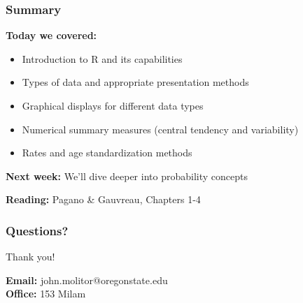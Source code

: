 \documentclass{beamer}
\begin{document}
\begin{frame}
\frametitle{Summary}
\textbf{Today we covered:}
\begin{itemize}
\item Introduction to R and its capabilities
\item Types of data and appropriate presentation methods
\item Graphical displays for different data types
\item Numerical summary measures (central tendency and variability)
\item Rates and age standardization methods
\end{itemize}

\vspace{0.5cm}
\textbf{Next week:} We'll dive deeper into probability concepts

\vspace{0.5cm}
\textbf{Reading:} Pagano \& Gauvreau, Chapters 1-4
\end{frame}

\begin{frame}
\frametitle{Questions?}
\begin{center}
\Large{Thank you!}

\vspace{1cm}

\textbf{Email:} john.molitor@oregonstate.edu\\
\textbf{Office:} 153 Milam
\end{center}
\end{frame}
\end{document}
